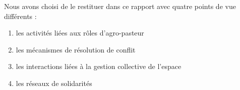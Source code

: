 Nous avons choisi de le restituer dans ce rapport avec quatre points de vue différents :
\begin{enumerate}
  \item les activités liées aux rôles d'agro-pasteur
  \item les mécanismes de résolution de conflit
  \item les interactions liées à la gestion collective de l'espace
  \item les réseaux de solidarités
\end{enumerate}
